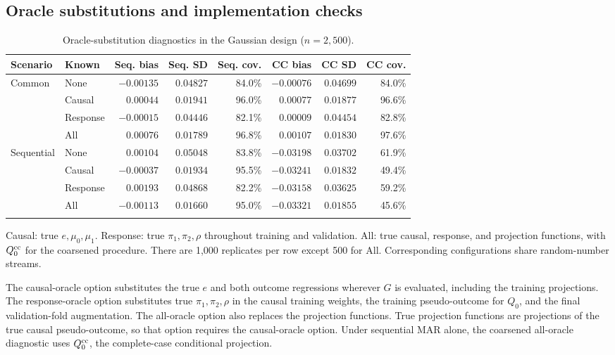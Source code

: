 \FloatBarrier
\subsection*{Oracle substitutions and implementation checks}

\begin{table}[htbp]
\centering
\begin{threeparttable}
\caption{Oracle-substitution diagnostics in the Gaussian design ($n=2{,}500$).}
\label{tab:crossfit-layers}
\footnotesize
\setlength{\tabcolsep}{4pt}
\begin{tabular}{@{}llrrrrrr@{}}
\toprule
Scenario & Known & Seq. bias & Seq. SD & Seq. cov. & CC bias & CC SD & CC cov. \\
\midrule
Common & None & $-0.00135$ & $0.04827$ & 84.0\% & $-0.00076$ & $0.04699$ & 84.0\% \\
 & Causal & $0.00044$ & $0.01941$ & 96.0\% & $0.00077$ & $0.01877$ & 96.6\% \\
 & Response & $-0.00015$ & $0.04446$ & 82.1\% & $0.00009$ & $0.04454$ & 82.8\% \\
 & All & $0.00076$ & $0.01789$ & 96.8\% & $0.00107$ & $0.01830$ & 97.6\% \\
\addlinespace
Sequential & None & $0.00104$ & $0.05048$ & 83.8\% & $-0.03198$ & $0.03702$ & 61.9\% \\
 & Causal & $-0.00037$ & $0.01934$ & 95.5\% & $-0.03241$ & $0.01832$ & 49.4\% \\
 & Response & $0.00193$ & $0.04868$ & 82.2\% & $-0.03158$ & $0.03625$ & 59.2\% \\
 & All & $-0.00113$ & $0.01660$ & 95.0\% & $-0.03321$ & $0.01855$ & 45.6\% \\
\addlinespace
\bottomrule
\end{tabular}
\begin{tablenotes}[flushleft]\footnotesize
\item Causal: true $e,\mu_0,\mu_1$. Response: true $\pi_1,\pi_2,\rho$ throughout training and validation. All: true causal, response, and projection functions, with $Q_0^{\mathrm{cc}}$ for the coarsened procedure. There are 1,000 replicates per row except 500 for All. Corresponding configurations share random-number streams.
\end{tablenotes}
\end{threeparttable}
\end{table}

The causal-oracle option substitutes the true $e$ and both outcome regressions wherever $G$ is evaluated, including the training projections. The response-oracle option substitutes true $\pi_1,\pi_2,\rho$ in the causal training weights, the training pseudo-outcome for $Q_0$, and the final validation-fold augmentation. The all-oracle option also replaces the projection functions. True projection functions are projections of the true causal pseudo-outcome, so that option requires the causal-oracle option. Under sequential MAR alone, the coarsened all-oracle diagnostic uses $Q_0^{\mathrm{cc}}$, the complete-case conditional projection.


